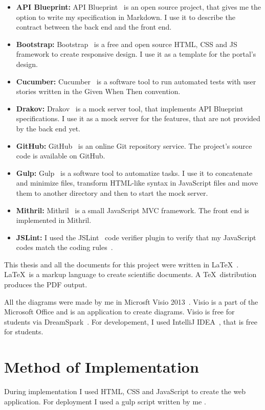 \begin{itemize}
	\item \textbf{API Blueprint:} API Blueprint~\cite{api-blueprint} is an open source project, that gives me the option to write my specification in Markdown. I use it to describe the contract between the back end and the front end.
	\item \textbf{Bootstrap:} Bootstrap~\cite{Bootstrap} is a free and open source HTML, CSS and JS framework to create responsive design. I use it as a template for the portal's design.
	\item \textbf{Cucumber:} Cucumber~\cite{Cucumber} is a software tool to run automated tests with user stories written in the Given When Then convention. 
	\item \textbf{Drakov:} Drakov~\cite{drakov} is a mock server tool, that implements API Blueprint specifications. I use it as a mock server for the features, that are not provided by the back end yet.
	\item \textbf{GitHub:} GitHub~\cite{github} is an online Git repository service. The project's source code is available on GitHub.
	\item \textbf{Gulp:} Gulp~\cite{gulp} is a software tool to automatize tasks. I use it to concatenate and minimize files, transform HTML-like syntax in JavaScript files and move them to another directory and then to start the mock server.
	\item \textbf{Mithril:} Mithril~\cite{Mithril} is a small JavaScript MVC framework. The front end is implemented in Mithril.
	\item \textbf{JSLint:} I used the JSLint~\cite{jetbrains-jslint} code verifier plugin to verify that my JavaScript codes match the coding rules~\cite{js-conventions}.

\end{itemize}

This thesis and all the documents for this project were written in \LaTeX~\cite{latex}. \LaTeX~is a markup language to create scientific documents. A \TeX~distribution produces the PDF output. 

All the diagrams were made by me in Microsft Visio 2013~\cite{visio}. Visio is a part of the Microsoft Office and is an application to create diagrams. Visio is free for students via DreamSpark~\cite{msdnaa}. For developement, I used IntelliJ IDEA~\cite{intellij-idea}, that is free for students.


\section{Method of Implementation}
During implementation I used HTML, CSS and JavaScript to create the web application. For deployment I used a gulp script written by me . 

